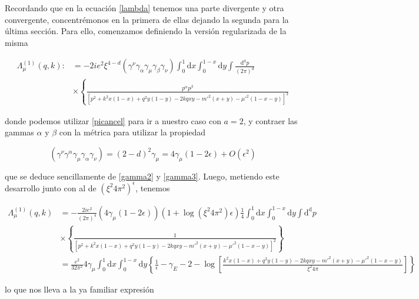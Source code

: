 \documentclass[tickz]{article}
\numberwithin{equation}{section}
\begin{document}
Recordando que en la ecuación \ref{lambda} tenemos una parte divergente y otra convergente, concentrémonos en la primera de ellas dejando la segunda para la última sección. Para ello, comenzamos definiendo la versión regularizada de la misma

\begin{equation}
\begin{aligned}
\Lambda^{(1)}_{\mu}(q,k):&=-2ie^2 \xi^{4-d} \left(\gamma^{\nu}\gamma_{\alpha}\gamma_{\mu} \gamma_{\beta} \gamma_{\nu}\right) \int_0^1\mathrm{d}x\int_0^{1-x}\mathrm{d}y \int \frac{\mathrm{d^d}p}{(2\pi)^d}\\
&\times \left\{ \frac{  p^{\alpha}p^{\beta}}{\left[p^2 + k^2x(1-x) +q^2y(1-y) -2kqxy -m'^2(x+y) -\mu'^2(1-x-y)\right]^3} \right.
\end{aligned}
\end{equation}

donde podemos utilizar \ref{picancel} para ir a nuestro caso con $ a=2 $, y contraer las gammas $ \alpha $ y $ \beta $ con la métrica para utilizar la propiedad

\begin{equation}\label{key}
\left(\gamma^{\nu}\gamma^{\alpha}\gamma_{\mu} \gamma_{\alpha} \gamma_{\nu}\right) = (2-d)^2 \gamma_{\mu} = 4\gamma_{\mu} (1-2\epsilon) + O(\epsilon^2)
\end{equation}

que se deduce sencillamente de \ref{gamma2} y \ref{gamma3}. Luego, metiendo este desarrollo junto con al de $ \left(\xi^2 4\pi^2\right)^{\epsilon} $, tenemos

\begin{equation}
\begin{aligned}
\Lambda^{(1)}_{\mu}(q,k)&=-\frac{2ie^2}{(2\pi)^4} \left(4\gamma_{\mu} (1-2\epsilon)\right)\left( 1 + \log\left(\xi^2 4\pi^2\right) \epsilon\right) \frac{1}{4}\int_0^1\mathrm{d}x\int_0^{1-x}\mathrm{d}y \int \mathrm{d^d}p\\
&\times \left\{ \frac{  1}{\left[p^2 + k^2x(1-x) +q^2y(1-y) -2kqxy -m'^2(x+y) -\mu'^2(1-x-y)\right]^2} \right\}\\
&=\frac{e^2}{32\pi^2} 4\gamma_{\mu} \int_0^1\mathrm{d}x\int_0^{1-x}\mathrm{d}y \left\{ \frac{1}{\epsilon} - \gamma_E - 2 - \log\left[\frac{k^2x(1-x) +q^2y(1-y) -2kqxy -m'^2(x+y) -\mu'^2(1-x-y)}{\xi^2 4\pi}\right]\right\}
\end{aligned}
\end{equation}

lo que nos lleva a la ya familiar expresión
\end{document}
